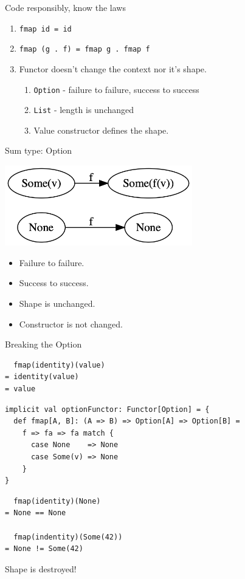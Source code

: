 \documentclass[presentation,aspectratio=169,smaller]{beamer}
\begin{document}
\begin{frame}[label={sec:orgdef7bf9},fragile]{Code responsibly, know the laws}
 \begin{enumerate}
\item <1-> \texttt{fmap id = id}
\item <2-> \texttt{fmap (g . f) = fmap g . fmap f}
\item <3-> Functor doesn't change the context nor it's shape.
\begin{enumerate}
\item \texttt{Option} - failure to failure, success to success
\item \texttt{List} - length is unchanged
\item Value constructor defines the shape.
\end{enumerate}
\end{enumerate}
\end{frame}

\begin{frame}[label={sec:org3697913}]{Sum type: Option}
\begin{center}
\includegraphics[height=3.5cm]{.dot/functor-option.png}
\end{center}

\begin{itemize}
\item Failure to failure.
\item Success to success.
\item Shape is unchanged.
\item Constructor is not changed.
\end{itemize}
\end{frame}

\begin{frame}[label={sec:orgf94d43a},fragile]{Breaking the Option}
 \begin{verbatim}
  fmap(identity)(value)
= identity(value)
= value
\end{verbatim}

\pause

\begin{verbatim}
implicit val optionFunctor: Functor[Option] = {
  def fmap[A, B]: (A => B) => Option[A] => Option[B] =
    f => fa => fa match {
      case None    => None
      case Some(v) => None
    }
}
\end{verbatim}

\pause

\begin{verbatim}
  fmap(identity)(None)
= None == None

  fmap(indentity)(Some(42))
= None != Some(42)
\end{verbatim}

Shape is destroyed!
\end{frame}
\end{document}
